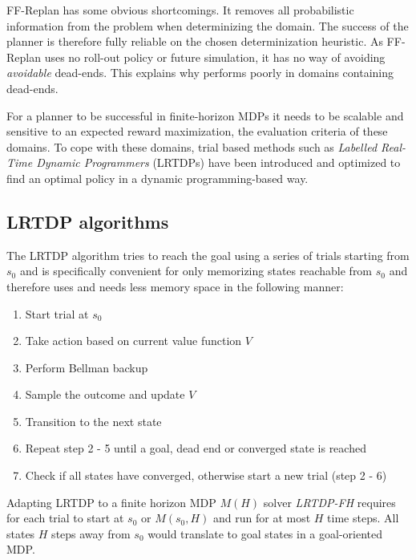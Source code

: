 \documentclass[runningheads,a4paper]{llncs}
\begin{document}
FF-Replan has some obvious shortcomings. It removes all probabilistic information from the problem when determinizing the domain. The success of the planner is therefore fully reliable on the chosen determinization heuristic. As FF-Replan uses no roll-out policy or future simulation, it has no way of avoiding \emph{avoidable} dead-ends. This explains why  performs poorly in domains containing dead-ends.

For a planner to be successful in finite-horizon MDPs it needs to be scalable and sensitive to an expected reward maximization, the evaluation criteria of these domains. To cope with these domains, trial based methods such as \emph{Labelled Real-Time Dynamic Programmers} (LRTDPs) have been introduced and optimized to find an optimal policy in a dynamic programming-based way.


\subsection{LRTDP algorithms}

The LRTDP algorithm tries to reach the goal using a series of trials starting from $s_0$ and is specifically convenient for only memorizing states reachable from $s_0$ and therefore uses and needs less memory space in the following manner:

\begin{enumerate}
	\item Start trial at $s_0$
	\item Take action based on current value function $V$
	\item Perform Bellman backup
	\item Sample the outcome and update $V$
	\item Transition to the next state
	\item Repeat step 2 - 5 until a goal, dead end or converged state is reached
	\item Check if all states have converged, otherwise start a new trial (step 2 - 6)
\end{enumerate}

Adapting LRTDP to a finite horizon MDP $M(H)$ solver \emph{LRTDP-FH} requires for each trial to start at $s_0$ or $M(s_0, H)$ and run for at most $H$ time steps. All states $H$ steps away from $s_0$ would translate to goal states in a goal-oriented MDP. \\
\end{document}
